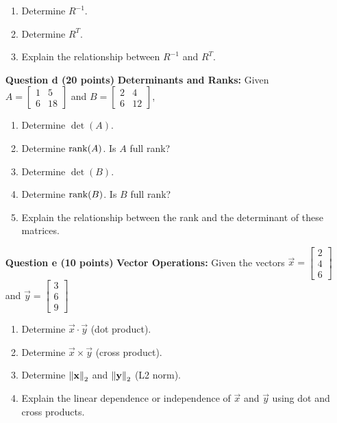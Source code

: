 \documentclass{16384_doc}
\begin{document}
\begin{enumerate}[label=\textbf{Question \alph*},leftmargin=*, align=left]
    \begin{enumerate}[label=(\roman*)]
        \item Determine $R^{-1}$.
        \item Determine $R^{T}$.
        \item Explain the relationship between $R^{-1}$ and $R^{T}$.
    \end{enumerate}
    
    \begin{tcolorbox}[height=20cm]
    \end{tcolorbox}

    \item[\textbf{Question d (20 points)}] \textbf{Determinants and Ranks:}
    Given $A = \begin{bmatrix} 1 & 5 \\ 6 & 18 \end{bmatrix}$ and $B = \begin{bmatrix} 2 & 4 \\ 6 & 12 \end{bmatrix}$,
    \begin{enumerate}[label=(\roman*)]
        \item Determine $\det(A)$.
        \item Determine $\operatorname{rank}(A)$. Is $A$ full rank?
        \item Determine $\det(B)$.
        \item Determine $\operatorname{rank}(B)$. Is $B$ full rank?
        \item Explain the relationship between the rank and the determinant of these matrices.
    \end{enumerate}

    \begin{tcolorbox}[height=15cm]
    \end{tcolorbox}

    \item[\textbf{Question e (10 points)}] \textbf{Vector Operations:}
    Given the vectors $\vec{x} = \begin{bmatrix}2 \\ 4 \\ 6\end{bmatrix}$ and $\vec{y} = \begin{bmatrix}3 \\ 6 \\ 9\end{bmatrix}$
    \begin{enumerate}[label=(\roman*)]
        \item Determine $\vec{x}\cdot\vec{y}$ (dot product).
        \item Determine $\vec{x} \times \vec{y}$ (cross product).
        \item Determine $\left\lVert\mathbf{x}\right\rVert_2$ and $\left\lVert\mathbf{y}\right\rVert_2$ (L2 norm).
        \item Explain the linear dependence or independence of $\vec{x}$ and $\vec{y}$ using dot and cross products.
    \end{enumerate}


\end{enumerate}
\end{document}
